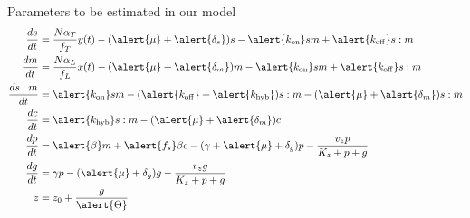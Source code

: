 \documentclass{beamer}
\begin{document}
\small
\begin{frame}{Parameters to be estimated in our model}
\begin{align*} 
\frac{ds}{dt} &= \frac{N\alpha_{T}}{f_{T}} y(t)-(\alert{\mu} + \alert{\delta_{s}})s -\alert{k_{\mathrm{on}}}sm +\alert{k_{\mathrm{off}}}s:m \\
\frac{dm}{dt} &=  \frac{N\alpha_{L}}{f_{L}}x(t)-(\alert{\mu} + \alert{\delta_{m}})m -\alert{k_{\mathrm{on}}}sm +\alert{k_{\mathrm{off}}}s:m  \\
\frac{ds:m}{dt} & = \alert{k_{\mathrm{on}}}sm  - (\alert{k_{\mathrm{off}}}+ \alert{k_{\mathrm{hyb}}})s:m  -(\alert{\mu} + \alert{\delta_{m}} )s:m \\
\frac{dc}{dt} & = \alert{k_{\mathrm{hyb}}}s:m  -(\alert{\mu} + \alert{\delta_{m}})c  \\
\frac{dp}{dt} & = \alert{\beta} m +\alert{f_{s}}\beta c -(\gamma + \alert{\mu} + \delta_{g})p - \frac{v_{z}p}{K_{z}+p+g}   \\
\frac{dg}{dt} & = \gamma p - (\alert{\mu} + \delta_{g})g - \frac{v_{z}g}{K_{z}+p+g} \\
z &= z_{0} +\frac{g}{\alert{\Theta}} 
\end{align*}
\end{frame}
\normalsize
\end{document}
